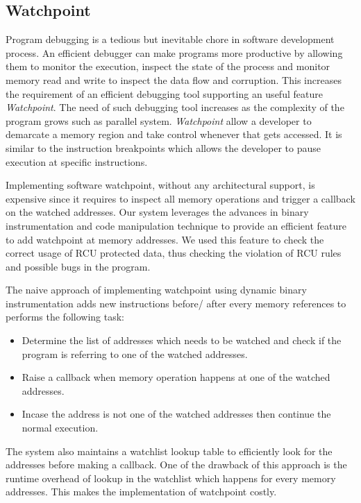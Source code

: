 \subsection{Watchpoint}
Program debugging is a tedious but inevitable chore in software development process. An efficient debugger can make programs more productive by allowing them to monitor the execution, inspect the state of the process and monitor memory read and write to inspect the data flow and corruption. This increases the requirement of an efficient debugging tool supporting an useful feature \emph{Watchpoint}. The need of such debugging tool increases as the complexity of the program grows such as parallel system. \emph{Watchpoint} allow a developer to demarcate a memory region and take control whenever that gets accessed. It is similar to the instruction breakpoints which allows the developer to pause execution at specific instructions.

Implementing software watchpoint, without any architectural support, is expensive since it requires to inspect all memory operations and trigger a callback on the watched addresses. Our system leverages the advances in binary instrumentation and code manipulation technique to provide an efficient feature to add watchpoint at memory addresses. We used this feature to check the correct usage of RCU protected data, thus checking the violation of RCU rules and possible bugs in the program.

The naive approach of implementing watchpoint using dynamic binary instrumentation adds new instructions before/ after every memory references to performs the following task: 
\begin{itemize}
	\item Determine the list of addresses which needs to be watched and check if the program is referring to one of the watched addresses.  
	\item Raise a callback when memory operation happens at one of the watched addresses.
	\item Incase the address is not one of the watched addresses then continue the normal execution.
\end{itemize}  
The system also maintains a watchlist lookup table to efficiently look for the addresses before making a callback. One of the drawback of this approach is the runtime overhead of lookup in the watchlist which happens for every memory addresses. This makes the implementation of watchpoint costly. 

